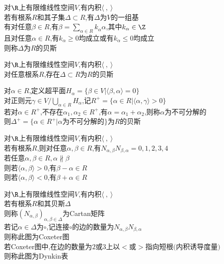 \begin{dingyi}
对$\R$上有限维线性空间$V$,有内积$\langle\ ,\ \rangle$\\
若有根系$R$和其子集$\Delta\subset R$,有$\Delta$为$V$的一组基\\
有对任意$\beta\in R$,有$\beta=\sum\limits_{\alpha\in R}k_{\alpha}\alpha$,其中$k_{\alpha}\in \Z$\\
且对任意$\alpha\in R$,有$k_{\alpha}\geq 0$均成立或有$k_{\alpha}\leq 0$均成立\\
则称$\Delta$为$R$的贝斯
\end{dingyi}

\begin{dingli}
对$\R$上有限维线性空间$V$,有内积$\langle\ ,\ \rangle$\\
对任意根系$R$,存在$\Delta\subset R$为$R$的贝斯
\end{dingli}

\begin{zhu}
对$\alpha\in R$,定义超平面$H_{\alpha}=\{\beta\in V|\langle\beta,\alpha\rangle=0\}$\\
对正则元$\gamma\in V/\bigcup\limits_{\alpha\in R}H_{\alpha}$,记$R^{+}=\{\alpha\in R|\langle\alpha,\gamma\rangle>0\}$\\
若对$\alpha\in R^{+}$,不存在$\alpha_1,\alpha_2\in R^{+}$,有$\alpha=\alpha_1+\alpha_2$,则称$\alpha$为不可分解的\\
则$\Delta^{+}=\{\alpha\in R^{+}|\alpha\text{为不可分解的}\}$为$R$的贝斯
\end{zhu}

\begin{dingli}
对$\R$上有限维线性空间$V$,有内积$\langle\ ,\ \rangle$\\
若有根系$R$,则对任意$\alpha,\beta\in R$,有$N_{\alpha,\beta}N_{\beta,\alpha}=0,1,2,3,4$\\
若任意$\alpha,\beta\in R,\alpha \not\parallel \beta$\\
则若$\langle \alpha,\beta \rangle>0$,有$\beta-\alpha \in R$\\
则若$\langle \alpha,\beta \rangle<0$,有$\beta+\alpha \in R$
\end{dingli}

\begin{dingyi}
对$\R$上有限维线性空间$V$,有内积$\langle\ ,\ \rangle$\\
若有根系$R$和其贝斯$\Delta$\\
则称$(N_{\alpha,\beta})_{\alpha,\beta\in \Delta}$为Cartan矩阵\\
若记$\alpha\in\Delta$为$\circ$,记连接$\circ$的边的数量为$N_{\alpha,\beta}N_{\beta,\alpha}$\\
则称此图为Coxeter图\\
若Coxeter图中,在边的数量为$2$或$3$上以$<$或$>$指向短根$($内积诱导度量$)$\\
则称此图为Dynkin表
\end{dingyi}



%